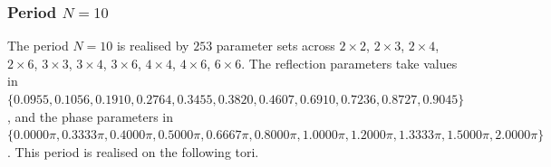 \par
\subsubsection{Period $N = 10$}
The period $N=10$ is realised by $253$ parameter sets across $2\times2$, $2\times3$, $2\times4$, $2\times6$, $3\times3$, $3\times4$, $3\times6$, $4\times4$, $4\times6$, $6\times6$. The reflection parameters take values in $\{0.0955, 0.1056, 0.1910, 0.2764, 0.3455, 0.3820, 0.4607, 0.6910, 0.7236, 0.8727, 0.9045\}$, and the phase parameters in $\{0.0000\pi, 0.3333\pi, 0.4000\pi, 0.5000\pi, 0.6667\pi, 0.8000\pi, 1.0000\pi, 1.2000\pi, 1.3333\pi, 1.5000\pi, 2.0000\pi\}$. This period is realised on the following tori.

